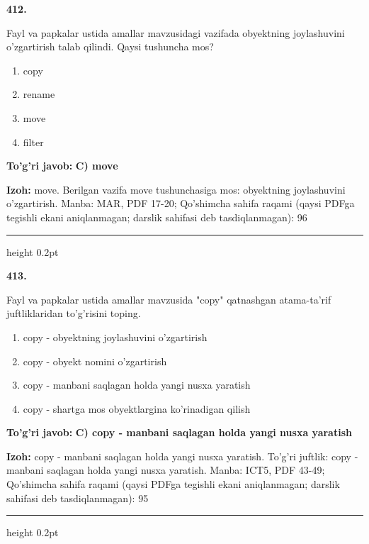 \documentclass[10pt,a4paper]{article}
\begin{document}
{\bfseries\sffamily\color{ink} 412.}
\par
Fayl va papkalar ustida amallar mavzusidagi vazifada obyektning joylashuvini o'zgartirish talab qilindi. Qaysi tushuncha mos?
\begin{enumerate}[label=\Alph*),leftmargin=9mm]
\item copy
\item rename
\item move
\item filter
\end{enumerate}
\begin{tcolorbox}[enhanced,breakable,colback=teal!4,colframe=teal!60!black,boxrule=0.45pt,arc=1.2mm,left=2.7mm,right=2.7mm,top=1.8mm,bottom=1.8mm,before skip=2mm,after skip=2mm]
{\bfseries\sffamily\color{teal}To'g'ri javob:} \textbf{C) move}
\par\smallskip
{\bfseries Izoh:} move. Berilgan vazifa move tushunchasiga mos: obyektning joylashuvini o'zgartirish. Manba: MAR, PDF 17-20; Qo'shimcha sahifa raqami (qaysi PDFga tegishli ekani aniqlanmagan; darslik sahifasi deb tasdiqlanmagan): 96
\end{tcolorbox}
\vspace{2mm}\hrule height 0.2pt\vspace{3mm}

{\bfseries\sffamily\color{ink} 413.}
\par
Fayl va papkalar ustida amallar mavzusida "copy" qatnashgan atama-ta'rif juftliklaridan to'g'risini toping.
\begin{enumerate}[label=\Alph*),leftmargin=9mm]
\item copy - obyektning joylashuvini o'zgartirish
\item copy - obyekt nomini o'zgartirish
\item copy - manbani saqlagan holda yangi nusxa yaratish
\item copy - shartga mos obyektlargina ko'rinadigan qilish
\end{enumerate}
\begin{tcolorbox}[enhanced,breakable,colback=teal!4,colframe=teal!60!black,boxrule=0.45pt,arc=1.2mm,left=2.7mm,right=2.7mm,top=1.8mm,bottom=1.8mm,before skip=2mm,after skip=2mm]
{\bfseries\sffamily\color{teal}To'g'ri javob:} \textbf{C) copy - manbani saqlagan holda yangi nusxa yaratish}
\par\smallskip
{\bfseries Izoh:} copy - manbani saqlagan holda yangi nusxa yaratish. To'g'ri juftlik: copy - manbani saqlagan holda yangi nusxa yaratish. Manba: ICT5, PDF 43-49; Qo'shimcha sahifa raqami (qaysi PDFga tegishli ekani aniqlanmagan; darslik sahifasi deb tasdiqlanmagan): 95
\end{tcolorbox}
\vspace{2mm}\hrule height 0.2pt\vspace{3mm}
\end{document}
